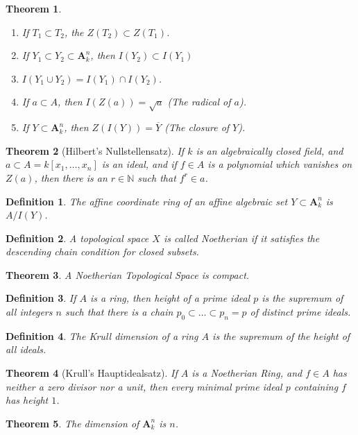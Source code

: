 \documentclass{article}
\theoremstyle{mystyle}
\newtheorem{theorem}{Theorem}[section]
\newtheorem{definition}{Definition}[section]
\begin{document}
\begin{theorem}
\
\begin{enumerate}
    \item If $T_1\subset T_2$, the  $Z(T_2)\subset Z(T_1)$.
    \item If $Y_1\subset Y_2 \subset \textbf{A}_k^n$, then $I(Y_2)\subset I(Y_1)$
    \item $I(Y_1\cup Y_2) = I(Y_1)\cap I(Y_2)$.
    \item If $a\subset A$, then $I(Z(a)) = \sqrt{a}$ (The radical of $a$).
    \item If $Y\subset \textbf{A}_k^n$, then $Z(I(Y)) = \overline{Y}$ (The closure of $Y$).
\end{enumerate}
\end{theorem}
\begin{theorem}[Hilbert's Nullstellensatz]
If $k$ is an algebraically closed field, and $a\subset A = k[x_1,\hdots ,x_n]$ is an ideal, and if $f\in A$ is a polynomial which vanishes on $Z(a)$, then there is an $r\in \mathbb{N}$ such that $f^r \in a$.
\end{theorem}
\begin{definition}
The affine coordinate ring of an affine algebraic set $Y\subset \textbf{A}_k^n$ is $A/I(Y)$.
\end{definition}
\begin{definition}
A topological space $X$ is called Noetherian if it satisfies the descending chain condition for closed subsets.
\end{definition}
\begin{theorem}
A Noetherian Topological Space is compact.
\end{theorem}
\begin{definition}
If $A$ is a ring, then height of a prime ideal $p$ is the supremum of all integers $n$ such that there is a chain $p_0\subset \hdots \subset p_n = p$ of distinct prime ideals.
\end{definition}
\begin{definition}
The Krull dimension of a ring $A$ is the supremum of the height of all ideals.
\end{definition}
\begin{theorem}[Krull's Hauptidealsatz]
If $A$ is a Noetherian Ring, and $f\in A$ has neither a zero divisor nor a unit, then every minimal prime ideal $p$ containing $f$ has height $1$.
\end{theorem}
\begin{theorem}
The dimension of $\textbf{A}_k^n$ is $n$.
\end{theorem}
\end{document}
